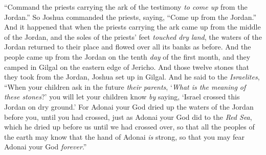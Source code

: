 \begin{biblechapter}
\verse “Command the priests carrying the ark of the testimony \textit{to come up} from the Jordan.”
\verse So Joshua commanded the priests, saying, “Come up from the Jordan.”
\verse And it happened that when the priests carrying the ark came up from the middle of the Jordan, and the soles of the priests’ feet \textit{touched dry land}, the waters of the Jordan returned to their place and flowed over all its banks as before.
\verse And the people came up from the Jordan on the tenth \textit{day} of the first month, and they camped in Gilgal on the eastern edge of Jericho.
\verse And those twelve stones that they took from the Jordan, Joshua set up in Gilgal.
\verse And he said to the \textit{Israelites}, “When your children ask in the future \textit{their parents}, ‘\textit{What is the meaning of these stones}?’
\verse you will let your children know \textit{by} saying, ‘Israel crossed this Jordan on dry ground.’
\verse For Adonai your God dried up the waters of the Jordan before you, until you had crossed, just as Adonai your God did to the \textit{Red Sea}, which he dried up before us until we had crossed over,
\verse so that all the peoples of the earth may know that the hand of Adonai \textit{is} strong, so that you may fear Adonai your God \textit{forever}.”
\end{biblechapter}

